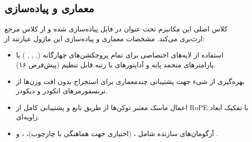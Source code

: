 \subsection{معماری و پیاده‌سازی}
کلاس اصلی این مکانیزم تحت عنوان  در فایل  پیاده‌سازی شده و از کلاس مرجع  ارث‌بری می‌کند. مشخصات معماری و پیاده‌سازی این ماژول عبارتند از:
\begin{itemize}
    \item استفاده از لایه‌های اختصاصی  برای تمام پروجکشن‌های چهارگانه (, , , ) با پارامترهای منجمد پایه و آداپتورهای با رتبه قابل تنظیم (پیش‌فرض ۱۶).
    \item بهره‌گیری از شیء  جهت پشتیبانی چندمعماری برای استخراج بدون افت وزن‌ها از ترنسفورمرهای انکودر و دیکودر.
    \item اعمال ماسک معتبر توکن‌ها از طریق تابع  و پشتیبانی کامل از RoPE با تفکیک ابعاد زاویه‌ای.
    \item آرگومان‌های سازنده شامل ،  (اختیاری جهت هماهنگی با چارچوب)، ، و .
\end{itemize}
